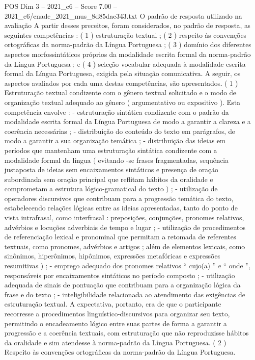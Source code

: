 \begin{textsample}{POS Dim 3 – 2021\_c6 – Score 7.00 – 2021\_c6/enade\_2021\_mus\_8d85dac343.txt}
O padrão de resposta utilizado na avaliação A partir desses preceitos, foram considerados, no padrão de resposta, as seguintes competências : ( 1 ) estruturação textual ; ( 2 ) respeito às convenções ortográficas da norma-padrão da Língua Portuguesa ; ( 3 ) domínio dos diferentes aspectos morfossintáticos próprios da modalidade escrita formal da norma-padrão da Língua Portuguesa ; e ( 4 ) seleção vocabular adequada à modalidade escrita formal da Língua Portuguesa, exigida pela situação comunicativa.
A seguir, os aspectos avaliados por cada uma destas competências, são apresentados. ( 1 ) Estruturação textual condizente com o gênero textual solicitado e o modo de organização textual adequado ao gênero ( argumentativo ou expositivo ).
Esta competência envolve : - estruturação sintática condizente com o padrão da modalidade escrita formal da Língua Portuguesa de modo a garantir a clareza e a coerência necessárias ; - distribuição do conteúdo do texto em parágrafos, de modo a garantir a sua organização temática ; - distribuição das ideias em períodos que mantenham uma estruturação sintática condizente com a modalidade formal da língua ( evitando -se frases fragmentadas, sequência justaposta de ideias sem encaixamentos sintáticos e presença de oração subordinada sem oração principal que reflitam hábitos da oralidade e comprometam a estrutura lógico-gramatical do texto ) ; - utilização de operadores discursivos que contribuam para a progressão temática do texto, estabelecendo relações lógicas entre as ideias apresentadas, tanto do ponto de vista intrafrasal, como interfrasal : preposições, conjunções, pronomes relativos, advérbios e locuções adverbiais de tempo e lugar ; - utilização de procedimentos de referenciação lexical e pronominal que permitam a retomada de referentes textuais, como pronomes, advérbios e artigos ; além de elementos lexicais, como sinônimos, hiperônimos, hipônimos, expressões metafóricas e expressões resumitivas ) ; - emprego adequado dos pronomes relativos “ cujo(a) ” e “ onde ”, responsáveis por encaixamentos sintáticos no período composto ; - utilização adequada de sinais de pontuação que contribuam para a organização lógica da frase e do texto ; - inteligibilidade relacionada ao atendimento das exigências de estruturação textual.
A expectativa, portanto, era de que o participante recorresse a procedimentos linguístico-discursivos para organizar seu texto, permitindo o encadeamento lógico entre suas partes de forma a garantir a progressão e a coerência textuais, com estruturação que não reproduzisse hábitos da oralidade e sim atendesse à norma-padrão da Língua Portuguesa. ( 2 ) Respeito às convenções ortográficas da norma-padrão da Língua Portuguesa.

\end{textsample}

